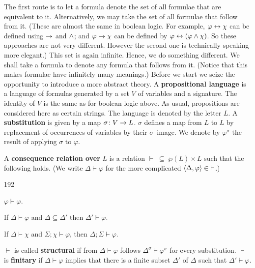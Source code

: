 The first route is to let a formula denote the set of all formulae
that are equivalent to it. Alternatively, we may take the set of
all formulae that follow from it. (These are almost the same in
boolean logic. For example, $\varphi\leftrightarrow\chi$ can be defined
using $\rightarrow$ and $\wedge$; and $\varphi \rightarrow \chi$ can be defined by
$\varphi \leftrightarrow (\varphi\wedge\chi)$. So these approaches are not very 
different. However the second one is technically speaking more 
elegant.) This set is again infinite. Hence, we do something different. 
We shall take a formula to denote any formula that follows from it. 
(Notice that this makes formulae have infinitely many meanings.)
Before we start we seize the opportunity to introduce a more abstract 
theory. A \textbf{propositional language} is a language of formulas 
generated by a set $V$ of variables and a signature. The identity of 
$V$ is the same as for boolean logic above. As usual, propositions are
considered here as certain strings. The language is denoted by the
letter $L$. A 
\textbf{substitution} is given by a map $\sigma \colon V \rightarrow
L$. $\sigma$ defines a map from $L$ to $L$ by replacement of
occurrences of variables by their $\sigma$--image. We denote by
$\varphi^{\sigma}$ the result of applying $\sigma$ to $\varphi$.
\begin{defn}
A \textbf{consequence relation over} 
$L$ is a relation $\vdash\;
\subseteq\; \wp(L) \times L$ such that the following holds.
(We write $\Delta \vdash \varphi$ for the more complicated
$\langle \Delta, \varphi\rangle \in\; \vdash$.)
\begin{dingautolist}{192}
\item $\varphi \vdash \varphi$.
\item If $\Delta \vdash \varphi$
and $\Delta \subseteq \Delta'$ then $\Delta' \vdash \varphi$.
\item If $\Delta \vdash \chi$ and $\Sigma;\chi \vdash
    \varphi$, then $\Delta; \Sigma \vdash \varphi$.
\end{dingautolist}
$\vdash$ is called \textbf{structural} 
if from $\Delta \vdash
\varphi$ follows $\Delta^{\sigma} \vdash \varphi^{\sigma}$ for
every substitution. $\vdash$ is \textbf{finitary} 
if $\Delta \vdash \varphi$ implies that there is a finite subset 
$\Delta'$ of $\Delta$ such that $\Delta' \vdash \varphi$.
\end{defn}
